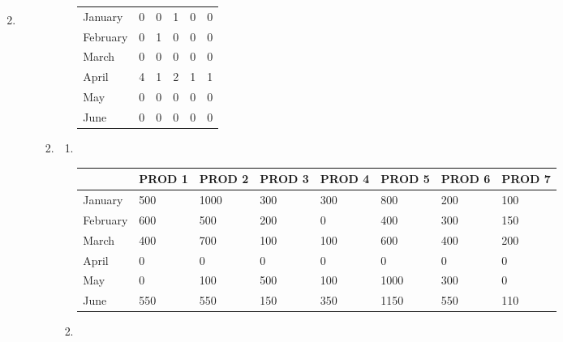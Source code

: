 \documentclass[12pt,a4paper]{article}
\makeatletter
\newtheorem*{solution}{Solution}
\theoremstyle{definition}
\renewenvironment{solution}[1][Solution] {\par\pushQED{\qed}\normalfont\topsep6\p@\@plus6\p@\relax\trivlist\item[\hskip\labelsep\bfseries#1\@addpunct{.}]\ignorespaces}{\popQED\endtrivlist\@endpefalse} \makeatother
\makeatother
\begin{document}
\begin{enumerate}
\begin{solution}
\begin{enumerate}
\begin{enumerate}
\begin{enumerate}
\begin{table}[htbp]
\begin{tabular}{m{} m{}<{\centering} m{}<{\centering} m{}<{\centering} m{}<{\centering} m{}<{\centering}}
          January & 0 & 0 & 1 & 0 & 0   \\
          February & 0 & 1 & 0 & 0 & 0   \\
          March & 0 & 0 & 0 & 0 & 0   \\
          April & 4 & 1 & 2 & 1 & 1  \\
          May & 0 & 0 & 0 & 0 & 0 \\
          June & 0 & 0 & 0 & 0 & 0  \\
          \hline
          \end{tabular}
        \end{table}
        \end{enumerate}
        
        \item
        \begin{enumerate}
            \item 
            ~
                \begin{table}[htbp]
              \scriptsize
              \centering
              \renewcommand\arraystretch{1.1}
              \begin{tabular}{m{} m{}<{\centering} m{}<{\centering} m{}<{\centering} m{}<{\centering} m{}<{\centering} m{}<{\centering} m{}<{\centering}}
              \hline
               & \textbf{PROD 1} & \textbf{PROD 2} & \textbf{PROD 3} & \textbf{PROD 4} & \textbf{PROD 5} & \textbf{PROD 6} &  \textbf{PROD 7} \\\hline
              January & 500 & 1000 & 300 & 300 & 800 & 200 & 100 \\
              February & 600 & 500 & 200 & 0 & 400 & 300 & 150 \\
              March & 400 & 700 & 100 & 100 & 600 & 400 & 200 \\
              April & 0 & 0 & 0 & 0 & 0 & 0 & 0 \\
              May & 0 & 100 & 500 & 100 & 1000 & 300 & 0 \\
              June & 550 & 550 & 150 & 350 & 1150 & 550 & 110 \\
              \hline
              \end{tabular}
            \end{table}
            \item 
            ~
                \begin{table}[htbp]
              \scriptsize
              \centering
              \renewcommand\arraystretch{1.1}

\end{table}
\end{enumerate}
\end{enumerate}
\end{enumerate}
\end{solution}
\end{enumerate}
\end{document}
